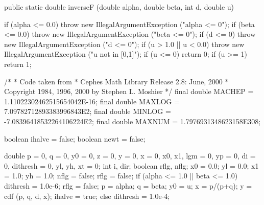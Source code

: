 \begin{code}

   public static double inverseF (double alpha, double beta, int d, double u)\begin{hide} {
      if (alpha <= 0.0)
         throw new IllegalArgumentException ("alpha <= 0");
      if (beta <= 0.0)
         throw new IllegalArgumentException ("beta <= 0");
      if (d <= 0)
        throw new IllegalArgumentException ("d <= 0");
      if (u > 1.0 || u < 0.0)
         throw new IllegalArgumentException ("u not in [0,1]");
      if (u <= 0)
         return 0;
      if (u >= 1)
         return 1;

      /*
       * Code taken from
       * Cephes Math Library Release 2.8:  June, 2000
       * Copyright 1984, 1996, 2000 by Stephen L. Moshier
       */
      final double MACHEP = 1.11022302462515654042E-16;
      final double MAXLOG = 7.09782712893383996843E2;
      final double MINLOG = -7.08396418532264106224E2;
      final double MAXNUM = 1.7976931348623158E308;

      boolean ihalve = false;
      boolean newt = false;

      double p = 0, q = 0, y0 = 0, z = 0, y = 0, x = 0, x0, x1, lgm = 0,
             yp = 0, di = 0, dithresh = 0, yl, yh, xt = 0;
      int i, dir;
      boolean rflg, nflg;
      x0 = 0.0;
      yl = 0.0;
      x1 = 1.0;
      yh = 1.0;
      nflg = false;
      rflg = false;
      if (alpha <= 1.0 || beta <= 1.0) {
         dithresh = 1.0e-6;
         rflg = false;
         p = alpha;
         q = beta;
         y0 = u;
         x = p/(p+q);
         y = cdf (p, q, d, x);
         ihalve = true;
      }
      else
         dithresh = 1.0e-4;

}
\end{hide}
\end{code}

